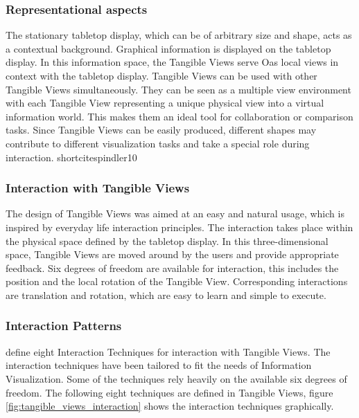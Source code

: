 \subsubsection{Representational aspects}
The stationary tabletop display, which can be of arbitrary size and shape, acts as a contextual background. Graphical information is displayed on the tabletop display. In this information space, the Tangible Views serve Oas local views in context with the tabletop display. Tangible Views can be used with other Tangible Views simultaneously. They can be seen as a multiple view environment with each Tangible View representing a unique physical view into a virtual information world. This makes them an ideal tool for collaboration or comparison tasks. Since Tangible Views can be easily produced, different shapes may contribute to different visualization tasks and take a special role during interaction. shortcite{spindler10}

\subsubsection{Interaction with Tangible Views}
The design of Tangible Views was aimed at an easy and natural usage, which is inspired by everyday life interaction principles. The interaction takes place within the physical space defined by the tabletop display. In this three-dimensional space, Tangible Views are moved around by the users and provide appropriate feedback. Six degrees of freedom are available for interaction, this includes the position and the local rotation of the Tangible View. Corresponding interactions are translation and rotation, which are easy to learn and simple to execute. 

\subsubsection{Interaction Patterns}
\cite{spindler10} define eight Interaction Techniques for interaction with Tangible Views. The interaction techniques have been tailored to fit the needs of Information Visualization. Some of the techniques rely heavily on the available six degrees of freedom. The following eight techniques are defined in Tangible Views, figure \ref{fig:tangible_views_interaction} shows the interaction techniques graphically.

